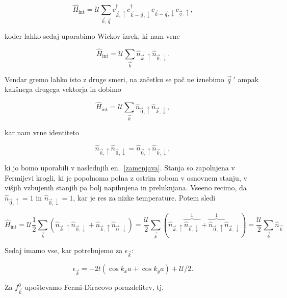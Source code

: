 \documentclass[a4paper, 12pt]{article}
\newcommand{\vq}{
	\ensuremath{\vec{q}}
}
\newcommand{\e}{
	\ensuremath{\epsilon}
}
\renewcommand{\u}{
	\ensuremath{\uparrow}
}
\renewcommand{\d}{
	\ensuremath{\downarrow}
}
\newcommand{\vk}{
	\ensuremath{\vec{k}}
}
\renewcommand{\ni}{
	\noindent
}
\begin{document}
\begin{equation}
	\hat{H}_\text{int} = \mathcal{U}\sum_{\vk, \vq} c^\dagger_{\vk, \u} c^\dagger_{\vk
		-\vq, \d} c_{\vk - \vq, \d} c_{\vq, \u},
\end{equation}

\ni koder lahko sedaj uporabimo Wickov izrek, ki nam vrne

\begin{equation}
	\hat{H}_\text{int} = \mathcal{U}\sum_{\vk} \hat{n}_{\vk,\u} \hat{n}_{\vec{0},\d}.
\end{equation}

\ni Vendar gremo lahko isto z druge smeri, na za\v cetku se pa\v c ne iznebimo $\vq\ '$ ampak kak\v snega
drugega vektorja in dobimo

\begin{equation}
	\hat{H}_\text{int} = \mathcal{U}\sum_{\vk} \hat{n}_{\vec{0},\u} \hat{n}_{\vk, \d},
\end{equation}

\ni kar nam vrne identiteto

\begin{equation}
	\hat{n}_{\vk, \u} \hat{n}_{\vec{0}, \d} = \hat{n}_{\vec{0},\u} \hat{n}_{\vk, \d},
\end{equation}

\ni ki jo bomo uporabili v naslednjih en.~\eqref{zamenjava}. Stanja so zapolnjena v Fermijevi krogli, ki je
popolnoma polna z ostrim robom v osnovnem stanju, v vi\v sjih vzbujenih stanjih pa bolj napihnjena in preluknjana.
Vseeno recimo, da $\hat{n}_{\vec{0}, \u} = 1$ in $\hat{n}_{\vec{0}, \d} = 1$, kar je res za nizke temperature.
Potem sledi

\begin{equation}
	\hat{H}_\text{int} = \mathcal{U}\frac{1}{2}\sum_{\vk} (\hat{n}_{\vk, \u} \hat{n}_{\vec{0}, \d}
		+ \hat{n}_{\vk, \u} \hat{n}_{\vec{0}, \d}) = \frac{\mathcal{U}}{2}\sum_{\vk} (\hat{n}_{\vk, \u}
		\overbrace{\hat{n}_{\vec{0}, \d}}^1 + \overbrace{\hat{n}_{\vec{0},\u}}^1 \hat{n}_{\vk, \d}) =
		\frac{\mathcal{U}}{2}\sum_{\vk} \hat{n}_{\vk}
	\label{zamenjava}
\end{equation}

Sedaj imamo vse, kar potrebujemo za $\e_{\vk}$:

\begin{equation}
	\e_{\vk} = -2t (\cos k_x a + \cos k_y a) + \mathcal{U}/2.
	\label{eps}
\end{equation}

\ni Za $f_{\vk}^0$ upo\v stevamo Fermi-Diracovo porazdelitev, tj.
\end{document}
